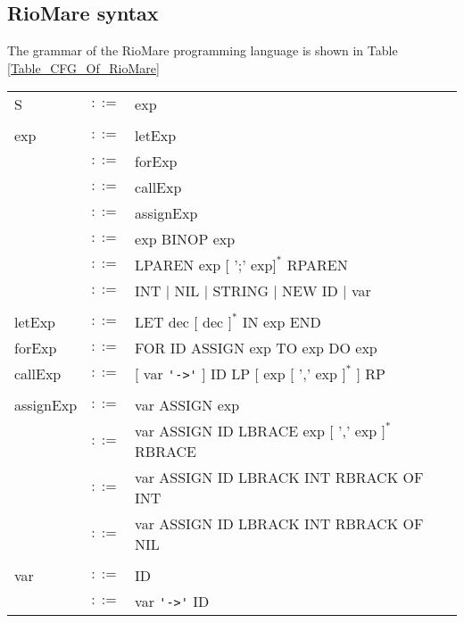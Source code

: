 \documentclass{article}
\begin{document}
\subsection{RioMare syntax}
The grammar of the RioMare programming language is shown in Table \ref{Table_CFG_Of_RioMare}
\begin{table}[h]
\centering
\begin{tabular}{ l c l }
  S                & $::=$ & exp                                                 \\ \\
  exp              & $::=$ & letExp                                              \\
                   & $::=$ & forExp                                              \\
                   & $::=$ & callExp                                             \\
                   & $::=$ & assignExp                                           \\
                   & $::=$ & exp BINOP exp                                       \\
                   & $::=$ & LPAREN exp $[$ ';' exp$]^{*}$ RPAREN                \\
                   & $::=$ & INT $|$ NIL $|$ STRING $|$ NEW ID $|$ var           \\ \\
  letExp           & $::=$ & LET dec $[$ dec $]^{*}$ IN exp END                  \\
  forExp           & $::=$ & FOR ID ASSIGN exp TO exp DO exp                     \\
  callExp          & $::=$ & $[$ var \verb"'->'" $]$ ID LP $[$ exp $[$ ',' exp $]^{*}$ $]$ RP \\ \\
  assignExp        & $::=$ & var ASSIGN exp                                      \\
                   & $::=$ & var ASSIGN ID LBRACE exp $[$ ',' exp $]^{*}$ RBRACE \\
                   & $::=$ & var ASSIGN ID LBRACK INT RBRACK OF INT              \\
                   & $::=$ & var ASSIGN ID LBRACK INT RBRACK OF NIL              \\ \\
  var              & $::=$ & ID                                                  \\
                   & $::=$ & var \verb"'->'" ID                                  \\

\end{tabular}
\end{table}
\end{document}
